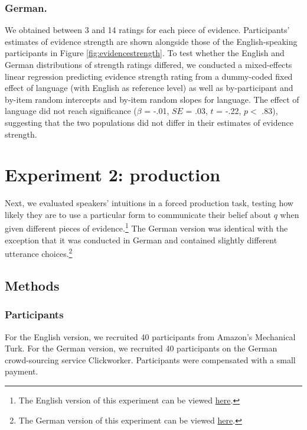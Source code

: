 \documentclass[11pt]{article}
\newcommand{\figref}[1]{Figure \ref{#1}}
\begin{document}
\subsubsection{German.}
We obtained between 3 and 14 ratings for each piece of evidence. Participants' estimates of evidence strength are shown alongside those of the English-speaking participants in  \figref{fig:evidencestrength}. To test whether the English and German distributions of strength ratings differed, we conducted a mixed-effects linear regression predicting evidence strength rating from a dummy-coded fixed effect of language (with English as reference level) as well as by-participant and by-item random intercepts and by-item random slopes for language. The effect of language did not reach significance ($\beta$ = -.01, $SE$ = .03, $t$ = -.22, $p <$ .83), suggesting that the two populations did not differ in their estimates of evidence strength.   

\section{Experiment 2: production}

Next, we evaluated speakers' intuitions in a forced production task, testing how likely they are to use a particular form to communicate their belief about $q$ when given different pieces of evidence.\footnote{The English version of this experiment can be viewed \href{http://stanford.edu/~jdegen/71_modals_forced_production/modals.html}{here}.} The German version was identical with the exception that it was conducted in German and contained slightly different utterance choices.\footnote{The German version of this experiment can be viewed \href{http://web.stanford.edu/~jdegen/cgi-bin/3_dp_production/modals.html}{here}.}

\subsection{Methods}

\subsubsection{Participants}

For the English version, we recruited 40 participants from Amazon's Mechanical Turk. For the German version, we recruited 40 participants on the German crowd-sourcing service Clickworker. Participants were compensated with a small payment.
\end{document}
